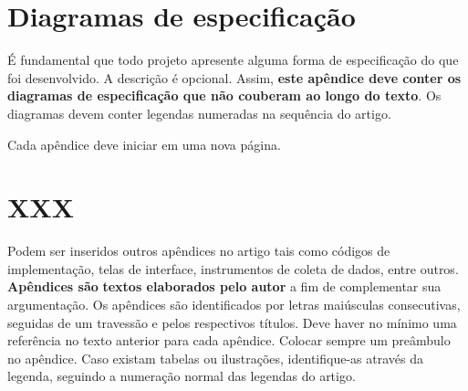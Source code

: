 \section{Diagramas de especificação}\label{sec:apendice-diagramas}

É fundamental que todo projeto apresente alguma forma de especificação
do que foi desenvolvido. A descrição é opcional. Assim, \textbf{este
apêndice deve conter os diagramas de especificação que não couberam ao
longo do texto}. Os diagramas devem conter legendas numeradas na
sequência do artigo.

Cada apêndice deve iniciar em uma nova página.

\clearpage
\section{XXX}\label{sec:apendice-xxx}

Podem ser inseridos outros apêndices no artigo tais como códigos de
implementação, telas de interface, instrumentos de coleta de dados,
entre outros. \textbf{Apêndices são} \textbf{textos elaborados pelo
autor} a fim de complementar sua argumentação. Os apêndices são
identificados por letras maiúsculas consecutivas, seguidas de um
travessão e pelos respectivos títulos. Deve haver no mínimo uma
referência no texto anterior para cada apêndice. Colocar sempre um
preâmbulo no apêndice. Caso existam tabelas ou ilustrações,
identifique-as através da legenda, seguindo a numeração normal das
legendas do artigo.
